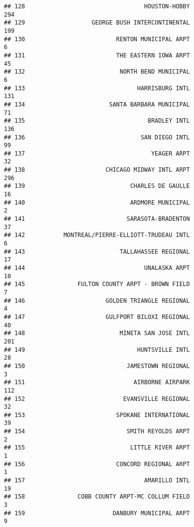 \documentclass[
]{article}
\begin{document}
\begin{verbatim}
## 128                                  HOUSTON-HOBBY                         294
## 129                   GEORGE BUSH INTERCONTINENTAL                         199
## 130                          RENTON MUNICIPAL ARPT                           6
## 131                          THE EASTERN IOWA ARPT                          45
## 132                           NORTH BEND MUNICIPAL                           6
## 133                                HARRISBURG INTL                         131
## 134                        SANTA BARBARA MUNICIPAL                          71
## 135                                   BRADLEY INTL                         136
## 136                                 SAN DIEGO INTL                          99
## 137                                    YEAGER ARPT                          32
## 138                       CHICAGO MIDWAY INTL ARPT                         296
## 139                              CHARLES DE GAULLE                          16
## 140                              ARDMORE MUNICIPAL                           2
## 141                             SARASOTA-BRADENTON                          37
## 142           MONTREAL/PIERRE-ELLIOTT-TRUDEAU INTL                           6
## 143                           TALLAHASSEE REGIONAL                          17
## 144                                  UNALASKA ARPT                          10
## 145               FULTON COUNTY ARPT - BROWN FIELD                           7
## 146                       GOLDEN TRIANGLE REGIONAL                           4
## 147                       GULFPORT BILOXI REGIONAL                          40
## 148                           MINETA SAN JOSE INTL                         201
## 149                                HUNTSVILLE INTL                          28
## 150                             JAMESTOWN REGIONAL                           3
## 151                               AIRBORNE AIRPARK                         112
## 152                            EVANSVILLE REGIONAL                          32
## 153                          SPOKANE INTERNATIONAL                          39
## 154                             SMITH REYOLDS ARPT                           2
## 155                              LITTLE RIVER ARPT                           1
## 156                          CONCORD REGIONAL ARPT                           1
## 157                                  AMARILLO INTL                          19
## 158               COBB COUNTY ARPT-MC COLLUM FIELD                           3
## 159                         DANBURY MUNICIPAL ARPT                           9

\end{verbatim}
\end{document}
